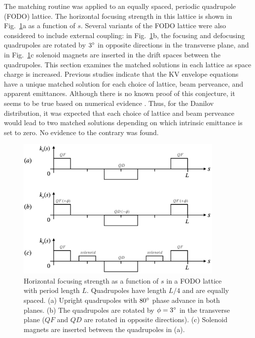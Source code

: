 The matching routine was applied to an equally spaced, periodic quadrupole (FODO) lattice. The horizontal focusing strength in this lattice is shown in Fig.~\ref{fig:fodo_lattices}a as a function of $s$. Several variants of the FODO lattice were also considered to include external coupling: in Fig.~\ref{fig:fodo_lattices}b, the focusing and defocusing quadrupoles are rotated by $3\degree$ in opposite directions in the transverse plane, and in Fig.~\ref{fig:fodo_lattices}c solenoid magnets are inserted in the drift spaces between the quadrupoles. This section examines the matched solutions in each lattice as space charge is increased. Previous studies indicate that the KV envelope equations have a unique matched solution for each choice of lattice, beam perveance, and apparent emittances. Although there is no known proof of this conjecture, it seems to be true based on numerical evidence \cite{Lund2006}. Thus, for the Danilov distribution, it was expected that each choice of lattice and beam perveance would lead to two matched solutions depending on which intrinsic emittance is set to zero. No evidence to the contrary was found.
%
\begin{figure}[!p]
    \centering
    \includegraphics[width=0.9\textwidth]{Images/chapter2/fodo_lattices.png}
    \caption{Horizontal focusing strength as a function of $s$ in a FODO lattice with period length $L$. Quadrupoles have length $L/4$ and are equally spaced. (a) Upright quadrupoles with $80\degree$ phase advance in both planes. (b) The quadrupoles are rotated by $\phi = 3\degree$ in the transverse plane ($QF$ and $QD$ are rotated in opposite directions). (c) Solenoid magnets are inserted between the quadrupoles in (a).}
    \label{fig:fodo_lattices}
\end{figure}


